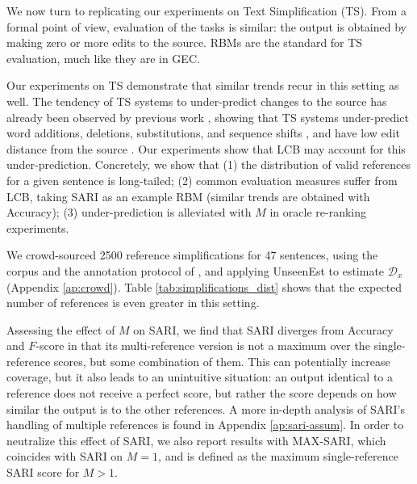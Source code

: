 \documentclass[11pt, a4paper]{article}
\begin{document}
We now turn to replicating our experiments on Text Simplification (TS). 
From a formal point of view, evaluation of the tasks is similar:
the output is obtained by making zero or more edits to the source. RBMs are the standard for TS evaluation,
much like they are in GEC.

Our experiments on TS demonstrate that similar trends recur in this setting as well. 
The tendency of TS systems to under-predict changes to the source 
has already been observed by previous work \cite{alvamanchego-EtAl:2017:I17-1}, 
showing that TS systems under-predict word additions, deletions,
substitutions, and sequence shifts \cite{zhang-lapata:2017:EMNLP2017},
and have low edit distance from the source \cite{narayan-gardent:2016:INLG}.
Our experiments show that LCB may account for this under-prediction. Concretely, we show that
(1) the distribution of valid references for a given sentence is long-tailed; 
(2) common evaluation measures suffer from LCB, taking SARI \cite{Xu-EtAl:2016:TACL} 
    as an example RBM (similar trends are obtained with Accuracy); 
(3) under-prediction is alleviated with $M$ in oracle re-ranking experiments.

We crowd-sourced 2500 reference simplifications for 47 sentences, using the corpus and the annotation protocol of 
, and applying {\sc UnseenEst} to estimate $\mathcal{D}_x$ (Appendix  \ref{ap:crowd}).
Table \ref{tab:simplifications_dist} shows that the expected number of references is even greater in this setting. 

Assessing the effect of $M$ on SARI, we find that SARI diverges from Accuracy and $F$-score
in that its multi-reference version is not a maximum over the single-reference scores, but some combination of them.
This can potentially increase coverage, but it also leads to an unintuitive situation: an output 
identical to a reference does not receive a perfect score, but rather the score depends on how similar the output is to the other
references. A more in-depth analysis of SARI's handling of multiple references is found in Appendix \ref{ap:sari-assum}.
In order to neutralize this effect of SARI, we also report results with MAX-SARI, which coincides with SARI on $M=1$, 
and is defined as the maximum single-reference SARI score for $M>1$.
\end{document}
